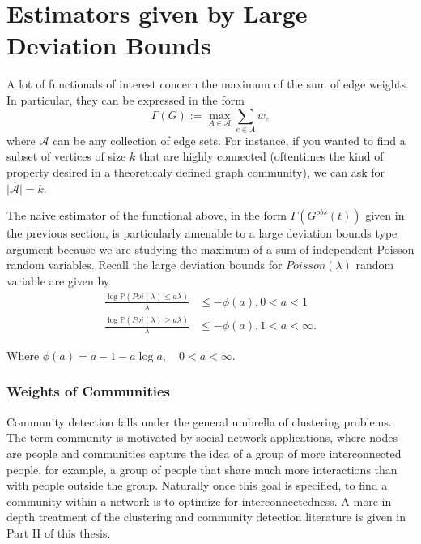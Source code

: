 \chapter{Estimators given by Large Deviation Bounds}


A lot of functionals of interest concern the maximum of the sum of edge weights.  In particular, they can be expressed in the form 
\begin{equation}
\Gamma(G) := \max_{A \in \mathcal{A}}\sum_{e\in A}w_e
\end{equation} 
where $\mathcal{A}$ can be any collection of edge sets.  For instance, if you wanted to find a subset of vertices of size $k$ that are highly connected (oftentimes the kind of property desired in a theoreticaly defined graph community), we can ask for $|\mathcal{A}| = k$. 

The naive estimator of the functional above, in the form $\Gamma(G^{obs}(t))$ given in the previous section, is particularly amenable to a large deviation bounds type argument because we are studying the maximum of a sum of independent Poisson random variables. Recall the large deviation bounds for $Poisson(\lambda)$ random variable are given by 
\begin{equation}
\begin{split}
\frac{\log \mathbb{P}(Poi(\lambda) \leq a\lambda)}{\lambda} &\leq -\phi(a), 0<a<1\\
\frac{\log \mathbb{P}(Poi(\lambda) \geq a\lambda)}{\lambda} &\leq -\phi(a), 1<a<\infty.
\end{split}
\end{equation}

Where $\phi(a)= a -1 -a\log a, \quad 0 < a < \infty$.
 
 \subsection{Weights of Communities}
 
 Community detection falls under the general umbrella of clustering problems.  The term community is motivated by social network applications, where nodes are people and communities capture the idea of a group of more interconnected people, for example, a group of people that share much more interactions than with people outside the group.  Naturally once this goal is specified, to find a community within a network is to optimize for interconnectedness.  A more in depth treatment of the clustering and community detection literature is given in Part II of this thesis.  
 
